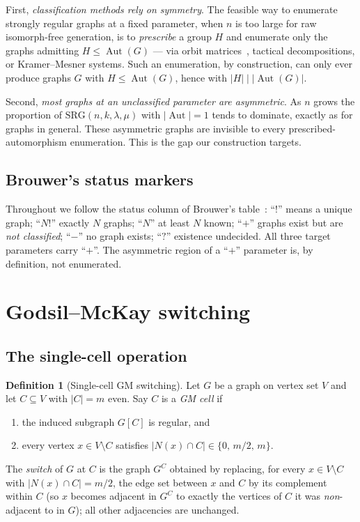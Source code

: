 \documentclass[11pt]{article}
\theoremstyle{definition}
\newtheorem{definition}{Definition}
\newcommand{\SRG}[1]{\mathrm{SRG}(#1)}
\newcommand{\Aut}{\operatorname{Aut}}
\begin{document}
First, \emph{classification methods rely on symmetry}. The feasible way to enumerate
strongly regular graphs at a fixed parameter, when $n$ is too large for raw isomorph-free
generation, is to \emph{prescribe} a group $H$ and enumerate only the graphs admitting
$H\le\Aut(G)$ --- via orbit matrices~\cite{behbahani-lam}, tactical decompositions, or
Kramer--Mesner systems. Such an enumeration, by construction, can only ever produce
graphs $G$ with $H \le \Aut(G)$, hence with $|H|\mid|\Aut(G)|$.

Second, \emph{most graphs at an unclassified parameter are asymmetric}. As $n$ grows the
proportion of $\SRG{n,k,\lambda,\mu}$ with $|\Aut|=1$ tends to dominate, exactly as for
graphs in general. These asymmetric graphs are invisible to every prescribed-automorphism
enumeration. This is the gap our construction targets.

\subsection{Brouwer's status markers}

Throughout we follow the status column of Brouwer's table~\cite{brouwer-table}:
``$!$'' means a unique graph; ``$N!$'' exactly $N$ graphs; ``$N$'' at least $N$ known;
``$+$'' graphs exist but are \emph{not classified}; ``$-$'' no graph exists; ``$?$''
existence undecided. All three target parameters carry ``$+$''. The asymmetric region of
a ``$+$'' parameter is, by definition, not enumerated.

\section{Godsil--McKay switching}\label{sec:gm}

\subsection{The single-cell operation}

\begin{definition}[Single-cell GM switching]\label{def:gm}
Let $G$ be a graph on vertex set $V$ and let $C\subseteq V$ with $|C|=m$ even. Say $C$ is
a \emph{GM cell} if
\begin{enumerate}
  \item[\textup{(i)}] the induced subgraph $G[C]$ is regular, and
  \item[\textup{(ii)}] every vertex $x\in V\setminus C$ satisfies
  $|N(x)\cap C|\in\{0,\,m/2,\,m\}$.
\end{enumerate}
The \emph{switch} of $G$ at $C$ is the graph $G^{C}$ obtained by replacing, for every
$x\in V\setminus C$ with $|N(x)\cap C|=m/2$, the edge set between $x$ and $C$ by its
complement within $C$ (so $x$ becomes adjacent in $G^{C}$ to exactly the vertices of $C$
it was \emph{non}-adjacent to in $G$); all other adjacencies are unchanged.
\end{definition}
\end{document}
